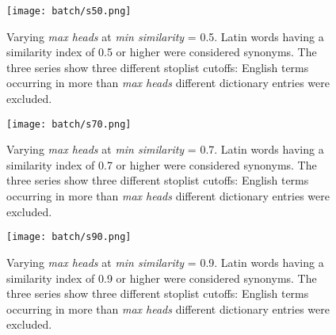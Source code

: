 \documentclass[]{article}
\begin{document}
	\begin{figure}
		\texttt{[image: batch/s50.png]}
		\caption{Varying \emph{max heads} at \emph{min similarity} = 0.5.  Latin words having a similarity index of 0.5 or higher were considered synonyms.  The three series show three different stoplist cutoffs: English terms occurring in more than \emph{max heads} different dictionary entries were excluded.\label{s50}}
	\end{figure}

	\begin{figure}
		\texttt{[image: batch/s70.png]}
		\caption{Varying \emph{max heads} at \emph{min similarity} = 0.7.  Latin words having a similarity index of 0.7 or higher were considered synonyms.  The three series show three different stoplist cutoffs: English terms occurring in more than \emph{max heads} different dictionary entries were excluded.\label{s70}}
	\end{figure}

	\begin{figure}
		\texttt{[image: batch/s90.png]}
		\caption{Varying \emph{max heads} at \emph{min similarity} = 0.9.  Latin words having a similarity index of 0.9 or higher were considered synonyms.  The three series show three different stoplist cutoffs: English terms occurring in more than \emph{max heads} different dictionary entries were excluded.\label{s90}}
	\end{figure}
	
\end{document}
